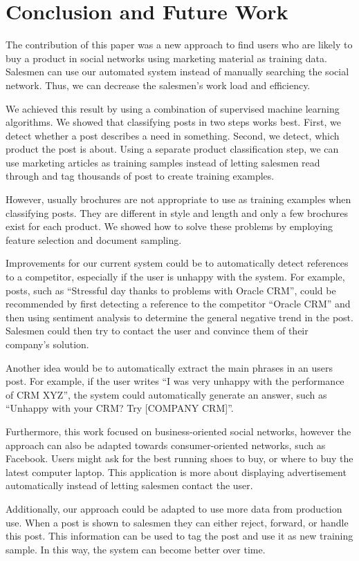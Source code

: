 \section{Conclusion and Future Work}
\label{sec:conclusion}

The contribution of this paper was a new approach to find users who are likely to buy a product in social networks using marketing material as training data.
Salesmen can use our automated system instead of manually searching the social network.
Thus, we can decrease the salesmen's work load and efficiency.

We achieved this result by using a combination of supervised machine learning algorithms.
We showed that classifying posts in two steps works best.
First, we detect whether a post describes a need in something.
Second, we detect, which product the post is about.
Using a separate product classification step, we can use marketing articles as training samples instead of letting salesmen read through and tag thousands of post to create training examples.

However, usually brochures are not appropriate to use as training examples when classifying posts.
They are different in style and length and only a few brochures exist for each product.
We showed how to solve these problems by employing feature selection and document sampling.

Improvements for our current system could be to automatically detect references to a competitor, especially if the user is unhappy with the system.
For example, posts, such as ``Stressful day thanks to problems with Oracle CRM'', could be recommended by first detecting a reference to the competitor ``Oracle CRM'' and then using sentiment analysis to determine the general negative trend in the post.
Salesmen could then try to contact the user and convince them of their company's solution.

Another idea would be to automatically extract the main phrases in an users post.
For example, if the user writes ``I was very unhappy with the performance of CRM XYZ'', the system could automatically generate an answer, such as ``Unhappy with your CRM? Try [COMPANY CRM]''.

Furthermore, this work focused on business-oriented social networks, however the approach can also be adapted towards consumer-oriented networks, such as Facebook.
Users might ask for the best running shoes to buy, or where to buy the latest computer laptop.
This application is more about displaying advertisement automatically instead of letting salesmen contact the user.

Additionally, our approach could be adapted to use more data from production use.
When a post is shown to salesmen they can either reject, forward, or handle this post.
This information can be used to tag the post and use it as new training sample.
In this way, the system can become better over time.
